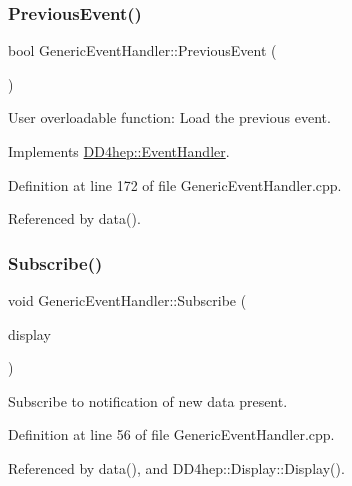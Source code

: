 \subsubsection{\texorpdfstring{Previous\+Event()}{PreviousEvent()}}
{\footnotesize\ttfamily bool Generic\+Event\+Handler\+::\+Previous\+Event (\begin{DoxyParamCaption}{ }\end{DoxyParamCaption})\hspace{0.3cm}{\ttfamily [virtual]}}



User overloadable function\+: Load the previous event. 



Implements \hyperlink{class_d_d4hep_1_1_event_handler_a0942608bebbdd107c9dedbdc7311791f}{D\+D4hep\+::\+Event\+Handler}.



Definition at line 172 of file Generic\+Event\+Handler.\+cpp.



Referenced by data().

\hypertarget{class_d_d4hep_1_1_generic_event_handler_a8065b0b0f095783b7daf38ff19660cf7}{}\label{class_d_d4hep_1_1_generic_event_handler_a8065b0b0f095783b7daf38ff19660cf7} 
\subsubsection{\texorpdfstring{Subscribe()}{Subscribe()}}
{\footnotesize\ttfamily void Generic\+Event\+Handler\+::\+Subscribe (\begin{DoxyParamCaption}\item[{\hyperlink{class_d_d4hep_1_1_event_consumer}{Event\+Consumer} $\ast$}]{display }\end{DoxyParamCaption})\hspace{0.3cm}{\ttfamily [virtual]}}



Subscribe to notification of new data present. 



Definition at line 56 of file Generic\+Event\+Handler.\+cpp.



Referenced by data(), and D\+D4hep\+::\+Display\+::\+Display().


